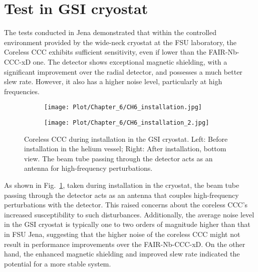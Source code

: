 \documentclass[12pt,a4paper]{report}
\begin{document}
    \section{Test in GSI cryostat}
	The tests conducted in Jena demonstrated that within the controlled environment provided by the wide-neck cryostat at the FSU laboratory, the Coreless CCC exhibits sufficient sensitivity, even if lower than the FAIR-Nb-CCC-xD one. The detector shows exceptional magnetic shielding, with a significant improvement over the radial detector, and possesses a much better slew rate. However, it also has a higher noise level, particularly at high frequencies.
	
	\begin{figure}[H]
		\begin{subfigure}[b]{0.42\textwidth}
			\centering
			\texttt{[image: Plot/Chapter\_6/CH6\_installation.jpg]}
		\end{subfigure}
		\hfill
		\begin{subfigure}[b]{0.58\textwidth}
			\centering
			\texttt{[image: Plot/Chapter\_6/CH6\_installation\_2.jpg]}
		\end{subfigure}
		\caption{\small{Coreless CCC during installation in the GSI cryostat. Left: Before installation in the helium vessel; Right: After installation, bottom view. The beam tube passing through the detector acts as an antenna for high-frequency perturbations.}}
		\label{CH6_coreless_installation}
	\end{figure}
	
	As shown in Fig.~\ref{CH6_coreless_installation}, taken during installation in the cryostat, the beam tube passing through the detector acts as an antenna that couples high-frequency perturbations with the detector. This raised concerns about the coreless CCC's increased susceptibility to such disturbances. Additionally, the average noise level in the GSI cryostat is typically one to two orders of magnitude higher than that in FSU Jena, suggesting that the higher noise of the coreless CCC might not result in performance improvements over the FAIR-Nb-CCC-xD. On the other hand, the enhanced magnetic shielding and improved slew rate indicated the potential for a more stable system.
	
 
 
    \printbibliography
    
\end{document}
